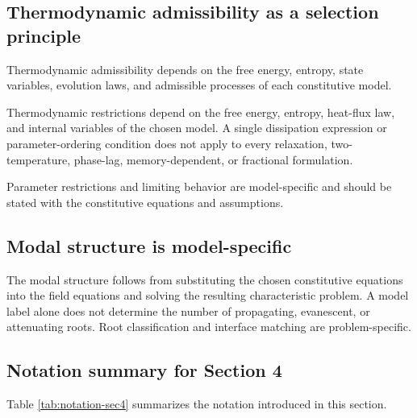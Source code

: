 \subsection{Thermodynamic admissibility as a selection principle}
\label{sec:4.14}

Thermodynamic admissibility depends on the free energy, entropy, state variables, evolution laws, and admissible processes of each constitutive model.

Thermodynamic restrictions depend on the free energy, entropy, heat-flux law, and internal variables of the chosen model. A single dissipation expression or parameter-ordering condition does not apply to every relaxation, two-temperature, phase-lag, memory-dependent, or fractional formulation.

Parameter restrictions and limiting behavior are model-specific and should be stated with the constitutive equations and assumptions.

\subsection{Modal structure is model-specific}
\label{sec:4.15}

The modal structure follows from substituting the chosen constitutive equations into the field equations and solving the resulting characteristic problem. A model label alone does not determine the number of propagating, evanescent, or attenuating roots. Root classification and interface matching are problem-specific.

\subsection{Notation summary for Section 4}

Table \ref{tab:notation-sec4} summarizes the notation introduced in this section.

